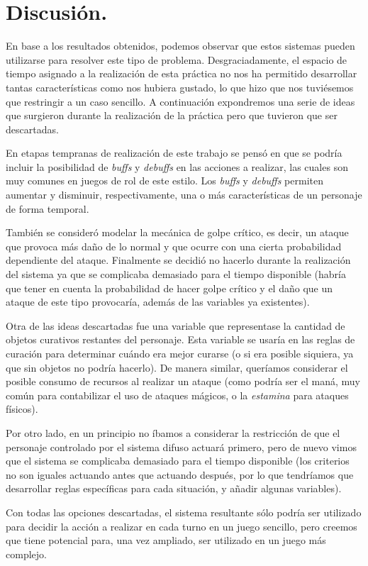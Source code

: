 \section{Discusión.}
En base a los resultados obtenidos, podemos observar que estos sistemas pueden utilizarse para resolver este tipo de problema. Desgraciadamente, el espacio de tiempo asignado a la realización de esta práctica no nos ha permitido desarrollar tantas características como nos hubiera gustado, lo que hizo que nos tuviésemos que restringir a un caso sencillo. A continuación expondremos una serie de ideas que surgieron durante la realización de la práctica pero que tuvieron que ser descartadas.

En etapas tempranas de realización de este trabajo se pensó en que se podría incluir la posibilidad de \textit{buffs} y \textit{debuffs} en las acciones a realizar, las cuales son muy comunes en juegos de rol de este estilo. Los \textit{buffs} y \textit{debuffs} permiten aumentar y disminuir, respectivamente, una o más características de un personaje de forma temporal.

También se consideró modelar la mecánica de golpe crítico, es decir, un ataque que provoca más daño de lo normal y que ocurre con una cierta probabilidad dependiente del ataque. Finalmente se decidió no hacerlo durante la realización del sistema ya que se complicaba demasiado para el tiempo disponible (habría que tener en cuenta la probabilidad de hacer golpe crítico y el daño que un ataque de este tipo provocaría, además de las variables ya existentes).

Otra de las ideas descartadas fue una variable que representase la cantidad de objetos curativos restantes del personaje. Esta variable se usaría en las reglas de curación para determinar cuándo era mejor curarse (o si era posible siquiera, ya que sin objetos no podría hacerlo). De manera similar, queríamos considerar el posible consumo de recursos al realizar un ataque (como podría ser el maná, muy común para contabilizar el uso de ataques mágicos, o la \textit{estamina} para ataques físicos). 

Por otro lado, en un principio no íbamos a considerar la restricción de que el personaje controlado por el sistema difuso actuará primero, pero de nuevo vimos que el sistema se complicaba demasiado para el tiempo disponible (los criterios no son iguales actuando antes que actuando después, por lo que tendríamos que desarrollar reglas específicas para cada situación, y añadir algunas variables).

Con todas las opciones descartadas, el sistema resultante sólo podría ser utilizado para decidir la acción a realizar en cada turno en un juego sencillo, pero creemos que tiene potencial para, una vez ampliado, ser utilizado en un juego más complejo.
